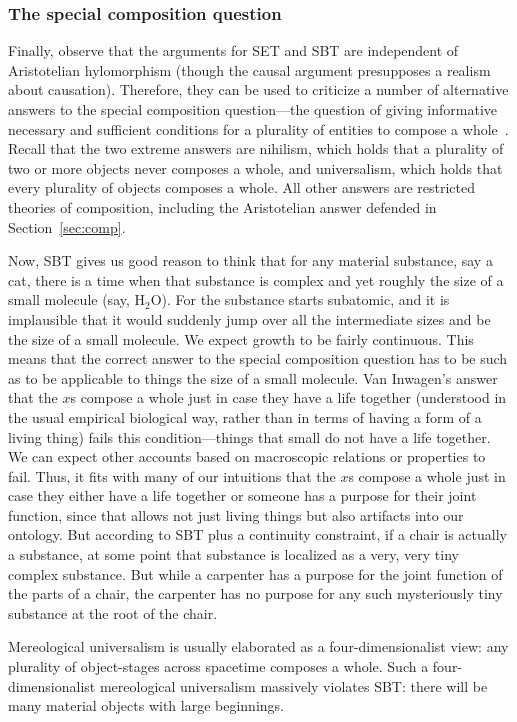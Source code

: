 \subsubsection{The special composition question}
Finally, observe that the arguments for SET and SBT are independent of Aristotelian hylomorphism (though the 
causal argument presupposes a realism about causation). Therefore, they can be used
to criticize a number of alternative answers to the special composition question---the question of giving informative 
necessary and sufficient conditions for a plurality of entities to compose a whole~\parencite{vanInwagenMaterialBeings}.
Recall that the two extreme answers are nihilism, which holds that a plurality of two or more objects never 
composes a whole, and universalism, which holds that every plurality of objects composes a whole. All other answers are  restricted theories of composition, including the Aristotelian answer defended in Section~\ref{sec:comp}.

Now, SBT gives us good reason to think that for any material substance, say a cat, there is a time when 
that substance is complex and yet roughly the size of a small molecule (say, H$_2$O). For the substance starts subatomic, 
and it is implausible that it would suddenly jump over all the intermediate sizes and be the size of a small molecule.
We expect growth to be fairly continuous. This means that the correct answer to the special composition question
has to be such as to be applicable to things the size of a small molecule. Van Inwagen's answer~\parencite{vanInwagenMaterialBeings} that the $x$s compose
a whole just in case they have a life together (understood in the usual empirical biological way, rather than in terms of having 
a form of a living thing) fails this condition---things that small do not have a life together. We can expect other 
accounts based on macroscopic relations or properties to fail. Thus, it fits with many of our intuitions that the $x$s 
compose a whole just in case they either have a life together or someone has a purpose for their joint function, since
that allows not just living things but also artifacts into our ontology. But according to SBT plus a continuity constraint,
if a chair is actually a substance, at some point that substance is localized as a very, very tiny complex substance.
But while a carpenter has a purpose for the joint function of the parts of a chair, the carpenter has no purpose for any 
such mysteriously tiny substance at the root of the chair. 

Mereological universalism is usually elaborated as a four-dimensionalist view: any plurality of object-stages across 
spacetime composes a whole. Such a four-dimensionalist mereological universalism massively violates SBT: there will be 
many material objects with large beginnings. 


